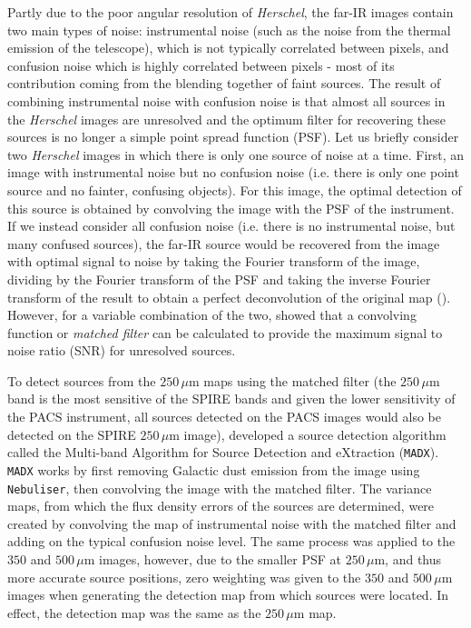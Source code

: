 Partly due to the poor angular resolution of \textit{Herschel}, the far-IR images contain two main types of noise: instrumental noise (such as the noise from the thermal emission of the telescope), which is not typically correlated between pixels, and confusion noise which is highly correlated between pixels - most of its contribution coming from the blending together of faint sources. The result of combining instrumental noise with confusion noise is that almost all sources in the \textit{Herschel} images are unresolved and the optimum filter for recovering these sources is no longer a simple point spread function (PSF). Let us briefly consider two \textit{Herschel} images in which there is only one source of noise at a time. First, an image with instrumental noise but no confusion noise (i.e. there is only one point source and no fainter, confusing objects). For this image, the optimal detection of this source is obtained by convolving the image with the PSF of the instrument. If we instead consider all confusion noise (i.e. there is no instrumental noise, but many confused sources), the far-IR source would be recovered from the image with optimal signal to noise by taking the Fourier transform of the image, dividing by the Fourier transform of the PSF and taking the inverse Fourier transform of the result to obtain a perfect deconvolution of the original map (\citealt{Valiante_2016}). However, for a variable combination of the two, \citealt{Chapin_2011} showed that a convolving function or \textit{matched filter} can be calculated to provide the maximum signal to noise ratio (SNR) for unresolved sources.

To detect sources from the $250\,\mu$m maps using the matched filter (the $250\,\mu$m band is the most sensitive of the SPIRE bands and given the lower sensitivity of the PACS instrument, all sources detected on the PACS images would also be detected on the SPIRE $250\,\mu$m image), \citealt{Maddox_2020} developed a source detection algorithm called the Multi-band Algorithm for Source Detection and eXtraction (\texttt{MADX}). \texttt{MADX} works by first removing Galactic dust emission from the image using \texttt{Nebuliser}, then convolving the image with the matched filter. The variance maps, from which the flux density errors of the sources are determined, were created by convolving the map of instrumental noise with the matched filter and adding on the typical confusion noise level. The same process was applied to the $350$ and $500\,\mu$m images, however, due to the smaller PSF at $250\,\mu$m, and thus more accurate source positions, zero weighting was given to the $350$ and $500\,\mu$m images when generating the detection map from which sources were located. In effect, the detection map was the same as the $250\,\mu$m map.

